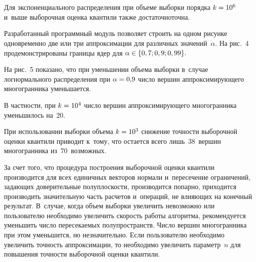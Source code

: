 \begin{multicols}{2}
\begin{figure*} %
\vspace*{1pt}
\begin{minipage}[t]{80mm}
 \begin{center}
 \mbox{%
 \epsfxsize=65.102mm 
 }
 \end{center}
\vspace*{-9pt}
\end{minipage}
\hfill
\vspace*{1pt}
\begin{minipage}[t]{80mm}
 \begin{center}
 \mbox{%
 \epsfxsize=64.929mm 
 }
 \end{center}
\vspace*{-9pt}
\end{minipage}
\end{figure*}


Для экспоненциального распределения при объеме выборки порядка $k\hm=10^6$ и~выше
 выборочная оценка кван\-ти\-ли также достаточно\linebreak точна.

Разработанный программный модуль позволяет строить на одном рисунке одновременно 
две или три аппроксимации для различных значений~$\alpha.$ На рис.~4 
продемонстрированы границы ядер для $\alpha\hm\in\{0,7; 0,9; 0,99\}.$




На рис.~5 показано, что при уменьшении объема выборки в~случае 
логнормального распределения при $\alpha\hm=0{,}9$
чис\-ло вершин аппроксимирующего многогранника уменьшается.


В частности, при $k\hm=10^4$ чис\-ло вершин аппроксимирующего многогранника 
уменьшилось на~20.


При использовании выборки объема $k\hm=10^3$ снижение 
точ\-ности выборочной оценки квантили приводит к~тому,
что остается всего лишь~38~вершин многогранника из~70~возможных.

За счет того, что процедура построения выборочной оценки квантили 
производится для всех единичных векторов нормали и~пересечение ограничений, 
задающих доверительные по\-лу\-плос\-кости, производится попарно, приходится 
производить значительную часть расчетов и~операций, не влия\-ющих на конечный 
результат. В~случае, когда объем выборки увеличить невозможно или пользователю 
необходимо увеличить ско\-рость работы алгоритма, рекомендуется уменьшить чис\-ло 
пересекаемых полупространств. Чис\-ло вершин многогранника при этом уменьшится, 
но незначительно. Если пользователю необходимо увеличить точ\-ность аппроксимации, 
то необходимо увеличить па\-ра\-метр~$n$ для повышения точ\-ности выборочной оценки 
кван\-тили.




\end{multicols}
